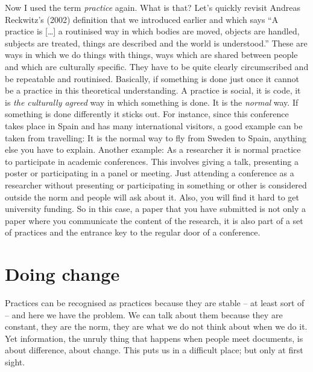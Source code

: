 ﻿\documentclass[a4paper,
fontsize=11pt,
oneside,
numbers=noperiodatend,
parskip=half-,
bibliography=totoc,
final
]{scrartcl}
\begin{document}
Now I used the term \emph{practice} again. What is that? Let's quickly
revisit Andreas Reckwitz's (2002) definition that we introduced earlier
and which says \enquote{A practice is {[}\ldots{}{]} a routinised way in
which bodies are moved, objects are handled, subjects are treated,
things are described and the world is understood.} These are ways in
which we do things with things, ways which are shared between people and
which are culturally specific. They have to be quite clearly
circumscribed and be repeatable and routinised. Basically, if something
is done just once it cannot be a practice in this theoretical
understanding. A practice is social, it is code, it is \emph{the
culturally agreed} way in which something is done. It is the
\emph{normal} way. If something is done differently it sticks out. For
instance, since this conference takes place in Spain and has many
international visitors, a good example can be taken from travelling: It
is the normal way to fly from Sweden to Spain, anything else you have to
explain. Another example: As a researcher it is normal practice to
participate in academic conferences. This involves giving a talk,
presenting a poster or participating in a panel or meeting. Just
attending a conference as a researcher without presenting or
participating in something or other is considered outside the norm and
people will ask about it. Also, you will find it hard to get university
funding. So in this case, a paper that you have submitted is not only a
paper where you communicate the content of the research, it is also part
of a set of practices and the entrance key to the regular door of a
conference.

\section*{Doing change}\label{doing-change}

Practices can be recognised as practices because they are stable -- at
least sort of -- and here we have the problem. We can talk about them
because they are constant, they are the norm, they are what we do not
think about when we do it. Yet information, the unruly thing that
happens when people meet documents, is about difference, about change.
This puts us in a difficult place; but only at first sight.
\end{document}
